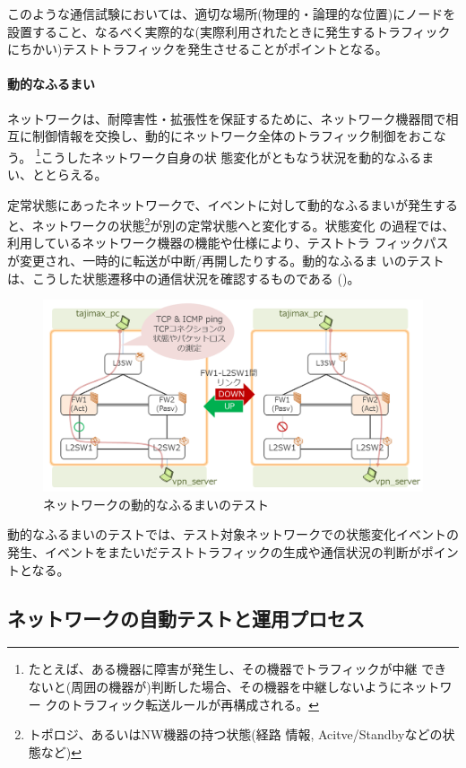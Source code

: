 このような通信試験においては、適切な場所(物理的・論理的な位置)にノードを
設置すること、なるべく実際的な(実際利用されたときに発生するトラフィック
にちかい)テストトラフィックを発生させることがポイントとなる。

    \paragraph{動的なふるまい}
ネットワークは、耐障害性・拡張性を保証するために、ネットワーク機器間で相
互に制御情報を交換し、動的にネットワーク全体のトラフィック制御をおこなう。
\footnote{たとえば、ある機器に障害が発生し、その機器でトラフィックが中継
できないと(周囲の機器が)判断した場合、その機器を中継しないようにネットワー
クのトラフィック転送ルールが再構成される。}こうしたネットワーク自身の状
態変化がともなう状況を動的なふるまい、ととらえる。

定常状態にあったネットワークで、イベントに対して動的なふるまいが発生する
と、ネットワークの状態\footnote{トポロジ、あるいはNW機器の持つ状態(経路
情報, Acitve/Standbyなどの状態など)}が別の定常状態へと変化する。状態変化
の過程では、利用しているネットワーク機器の機能や仕様により、テストトラ
フィックパスが変更され、一時的に転送が中断/再開したりする。動的なふるま
いのテストは、こうした状態遷移中の通信状況を確認するものである
()。
\begin{figure}[h]
 \centering
 \includegraphics[scale=0.5]{img/test-dynamic.png}
 \caption{ネットワークの動的なふるまいのテスト}
 \label{fig:test-dynamic}
\end{figure}

動的なふるまいのテストでは、テスト対象ネットワークでの状態変化イベントの
発生、イベントをまたいだテストトラフィックの生成や通信状況の判断がポイン
トとなる。

  \subsection{ネットワークの自動テストと運用プロセス}
  \label{sec:network-test-and-process}

